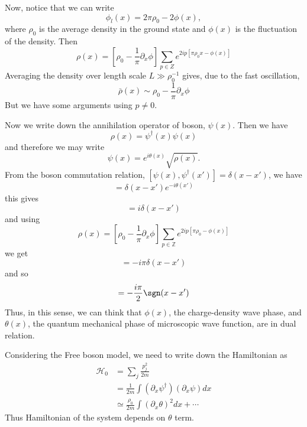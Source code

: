 Now, notice that we can write
\begin{equation}
\phi_l(x)=2\pi \rho_0-2\phi(x),
\end{equation}
where $\rho_0$ is the average density in the ground state and $\phi(x)$ is the fluctuation of the density. Then
\begin{equation}
\rho(x)=\left[\rho_0-\frac{1}{\pi}\partial_x\phi\right]\sum_{p\in Z}e^{2ip\left[\pi\rho_0 x-\phi(x)\right]}
\end{equation}
Averaging the density over length scale $L\gg \rho_0^{-1}$ gives, due to the fast oscillation,
\begin{equation}
\bar{\rho}(x)\sim \rho_0-\frac{1}{\pi}\partial_x\phi
\end{equation}
But we have some arguments using $p\neq 0$.

Now we write down the annihilation operator of boson, $\psi(x)$. Then we have
\begin{equation}
\rho(x)=\psi^\dagger(x)\psi(x)
\end{equation}
and therefore we may write
\begin{equation}
\psi(x)=e^{i\theta(x)}\sqrt{\rho(x)}.
\end{equation}
From the boson commutation relation, $[\psi(x),\psi^\dagger(x')]=\delta(x-x')$, we have
\begin{equation}
[\rho(x),e^{-i\theta(x')}]=\delta(x-x')e^{-i\theta(x')}
\end{equation}
this gives
\begin{equation}
[\rho(x),\theta(x')]=i\delta(x-x')
\end{equation}
and using
\begin{equation}
\rho(x)=\left[\rho_0-\frac{1}{\pi}\partial_x\phi\right]\sum_{p\in \mathbb{Z}}e^{2ip[\pi\rho_0-\phi(x)]}
\end{equation}
we get
\begin{equation}
[\partial_x\phi(x),\theta(x')]=-i\pi\delta(x-x')
\end{equation}
and so
\begin{equation}
[\phi(x),\theta(x')]=-\frac{i\pi}{2}\sgn(x-x')
\end{equation}
Thus, in this sense, we can think that $\phi(x)$, the charge-density wave phase, and $\theta(x)$, the quantum mechanical phase of microscopic wave function, are in dual relation.

Considering the Free boson model, we need to write down the Hamiltonian as
\begin{align*}
\mathcal{H}_0&=\sum_j\frac{p_j^2}{2m}\\
&=\frac{1}{2m}\int(\partial_x \psi^\dagger)(\partial_x\psi)dx\\
&\simeq \frac{\rho_0}{2m}\int (\partial_x\theta)^2 dx+\cdots
\end{align*}
Thus Hamiltonian of the system depends on $\theta$ term.

